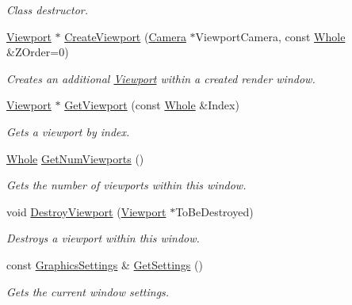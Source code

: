 \begin{DoxyCompactItemize}
\begin{DoxyCompactList}\small\item\em Class destructor. \item\end{DoxyCompactList}\item 
\hyperlink{classphys_1_1Viewport}{Viewport} $\ast$ \hyperlink{classphys_1_1GameWindow_a85802f1c30d43bb2992f95ac58683961}{CreateViewport} (\hyperlink{classphys_1_1Camera}{Camera} $\ast$ViewportCamera, const \hyperlink{namespacephys_a460f6bc24c8dd347b05e0366ae34f34a}{Whole} \&ZOrder=0)
\begin{DoxyCompactList}\small\item\em Creates an additional \hyperlink{classphys_1_1Viewport}{Viewport} within a created render window. \item\end{DoxyCompactList}\item 
\hyperlink{classphys_1_1Viewport}{Viewport} $\ast$ \hyperlink{classphys_1_1GameWindow_a048bdd313420da1902bdc5226d14ae47}{GetViewport} (const \hyperlink{namespacephys_a460f6bc24c8dd347b05e0366ae34f34a}{Whole} \&Index)
\begin{DoxyCompactList}\small\item\em Gets a viewport by index. \item\end{DoxyCompactList}\item 
\hyperlink{namespacephys_a460f6bc24c8dd347b05e0366ae34f34a}{Whole} \hyperlink{classphys_1_1GameWindow_a4b97aaa248a2382b78520b1623dc2978}{GetNumViewports} ()
\begin{DoxyCompactList}\small\item\em Gets the number of viewports within this window. \item\end{DoxyCompactList}\item 
void \hyperlink{classphys_1_1GameWindow_ac9c359317e9a1612fbc5fef886de4040}{DestroyViewport} (\hyperlink{classphys_1_1Viewport}{Viewport} $\ast$ToBeDestroyed)
\begin{DoxyCompactList}\small\item\em Destroys a viewport within this window. \item\end{DoxyCompactList}\item 
const \hyperlink{structphys_1_1GraphicsSettings}{GraphicsSettings} \& \hyperlink{classphys_1_1GameWindow_a9f74d3e37c8ad83727c050175927bdc1}{GetSettings} ()
\begin{DoxyCompactList}\small\item\em Gets the current window settings. \item\end{DoxyCompactList}\item 

\end{DoxyCompactItemize}
